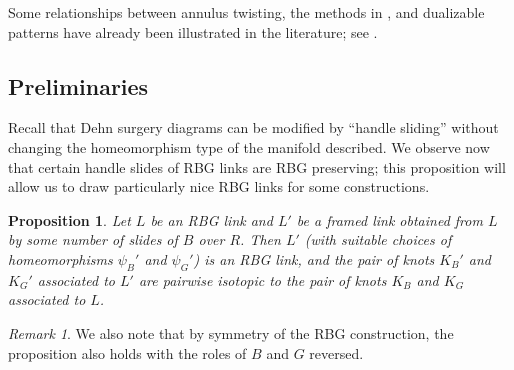 \documentclass [11pt]{amsart}
\newtheorem {proposition}[theorem]{Proposition}
\theoremstyle{remark}
\newtheorem {remark}[theorem]{Remark}
\begin{document}
Some relationships between annulus twisting, the methods in \cite{Pic1}, and dualizable patterns have already been illustrated in the literature; see \cite{MP17, Pic1, Tagami20}. 

\subsection{Preliminaries}
Recall that Dehn surgery diagrams can be modified by ``handle sliding'' without changing the homeomorphism type of the manifold described. We observe now that certain handle slides of RBG links are RBG preserving; this proposition will allow us to draw particularly nice RBG links for some constructions. 

\begin{proposition}\label{prop:RBGslides}
Let $L$ be an RBG link and $L'$ be a framed link obtained from $L$ by some number of slides of $B$ over $R$. Then $L'$ (with suitable choices of homeomorphisms $\psi_B'$ and $\psi_G'$) is an RBG link,   and the pair of knots $K_B'$ and $K_G'$ associated to $L'$ are pairwise isotopic to the pair of knots $K_B$ and $K_G$ associated to $L$.
\end{proposition} 

\begin{remark}
We also note that by symmetry of the RBG construction, the proposition also holds with the roles of $B$ and $G$ reversed.  
\end{remark}
\end{document}
